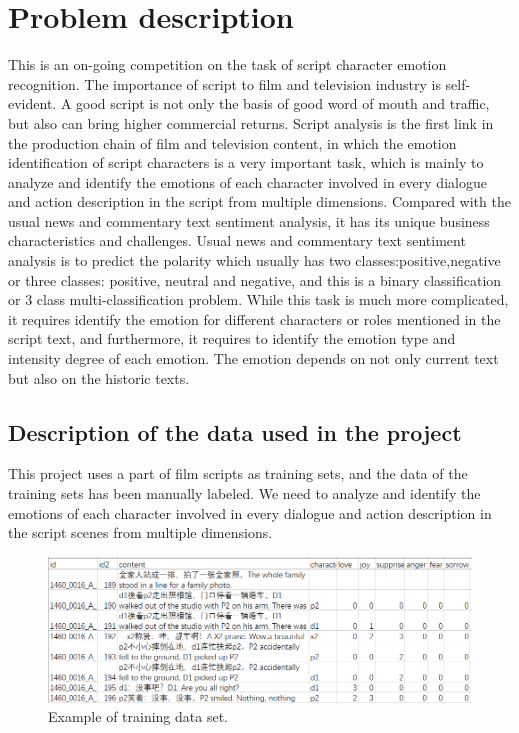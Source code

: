 \documentclass[12pt,twocolumn,letterpaper]{article}
\begin{document}
\section{Problem description}

This is an on-going competition on the task of script character emotion recognition. The importance of script to film and television industry is self-evident. A good script is not only the basis of good word of mouth and traffic, but also can bring higher commercial returns. Script analysis is the first link in the production chain of film and television content, in which the emotion identification of script characters is a very important task, which is mainly to analyze and identify the emotions of each character involved in every dialogue and action description in the script from multiple dimensions. Compared with the usual news and commentary text sentiment analysis, it has its unique business characteristics and challenges. Usual news and commentary text sentiment analysis is to predict the polarity which usually has two classes:positive,negative or three classes: positive, neutral and negative, and this is a binary classification or 3 class multi-classification problem. While this task is much more complicated, it requires identify the emotion for different characters or roles mentioned in the script text, and furthermore, it requires to identify the emotion type and intensity degree of each emotion. The emotion depends on not only current text but also on the historic texts.




\subsection{Description of the data used in the project}
This project uses a part of film scripts as training sets, and the data of the training sets has been manually labeled. We need to analyze and identify the emotions of each character involved in every dialogue and action description in the script scenes from multiple dimensions. 
\begin{figure}
\begin{center}
\includegraphics[scale=0.9]{data_sample.png}
\end{center}
   \caption{Example of training data set.}
\label{fig:short}
\end{figure}
\end{document}
